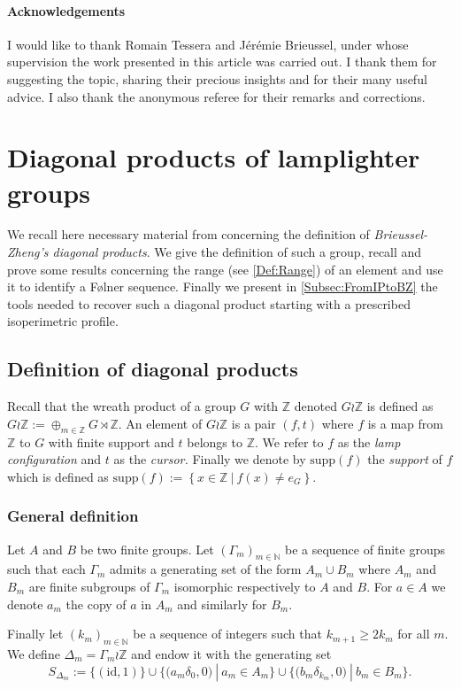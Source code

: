 \documentclass[english, 11pt, a4paper]{article}
\newcommand{\deffont}[1]{\emph{#1}}
\theoremstyle{definition}
\numberwithin{equation}{section}
\newcommand{\bN}{\mathbb{N}}
\newcommand{\bZ}{\mathbb{Z}}
\newcommand{\Gs}{\Gamma_m}
\newcommand{\Ds}{\Delta_m}
\newcommand{\WDs}{\Gs\wr\bZ} %
\newcommand{\supp}{\mathrm{supp}}
\begin{document}
\paragraph{Acknowledgements} 
I would like to thank Romain Tessera and Jérémie Brieussel, under
whose supervision the work presented in this article was carried out.
I thank them for suggesting the topic, sharing their precious insights and for
their many useful advice. I also thank the anonymous referee for their remarks
and corrections.
\section{Diagonal products of lamplighter groups}\label{Sec:BZGroupsZ}
\label{Sec:DefdeBZ}
We recall here necessary material from \cite{BZ} concerning the definition of
\emph{Brieussel-Zheng’s diagonal products}. We give the definition of such
a group, recall and prove some results concerning the range (see
\cref{Def:Range}) of an element and use it to identify a Følner
sequence. Finally we present in \cref{Subsec:FromIPtoBZ} the tools needed to
recover such a diagonal product starting with a prescribed isoperimetric
profile.

\subsection{Definition of diagonal products} \label{subsec:DefDelta}
Recall that the wreath product of a group $G$ with $\bZ$ denoted $G \wr \bZ$ is
defined as $G\wr \bZ:= \oplus_{m \in \bZ} G \rtimes \bZ$. An element of $G\wr
\bZ$ is a pair $(f,t)$ where $f$ is a map from $\bZ$ to $G$ with finite support
and $t$ belongs to $\bZ$. We refer to $f$ as the \deffont{lamp configuration}
and $t$ as the \deffont{cursor.} Finally we denote by $\supp(f)$ the
\deffont{support} of $f$ which is defined as
$\supp(f):=\left\{x\in \bZ \ | \ f(x)\neq e_G \right\}$.

\subsubsection{General definition}
Let $A$ and $B$ be two finite groups. Let $(\Gamma_m)_{m\in \bN}$ be a sequence
of finite groups such that each $\Gamma_m$ admits a generating set of the form $A_m \cup B_m$
where $A_m$ and $B_m$ are finite subgroups of $\Gamma_m$ isomorphic respectively
to $A$ and $B$. For $a \in A$ we denote $a_m$ the copy of $a$ in $A_m$ and
similarly for $B_m$.

Finally let $(k_m)_{m \in \bN}$ be a sequence of integers such that $k_{m+1} \geq 2 k_m$
for all $m$. We define $\Ds=\WDs$ and endow it with the generating set  \label{Def:SDeltam}
\begin{equation*}
  S_{\Ds}:=
  \Big\{ (\mathrm{id},1 )\Big\} \cup \Big\{ \big(a_m \delta_0,0 \big) \ | \ a_m \in A_m\Big\}
  \cup \Big\{ \big(b_m \delta_{k_m},0 \big) \ | \ b_m \in B_m\Big\}.
\end{equation*}
\end{document}

